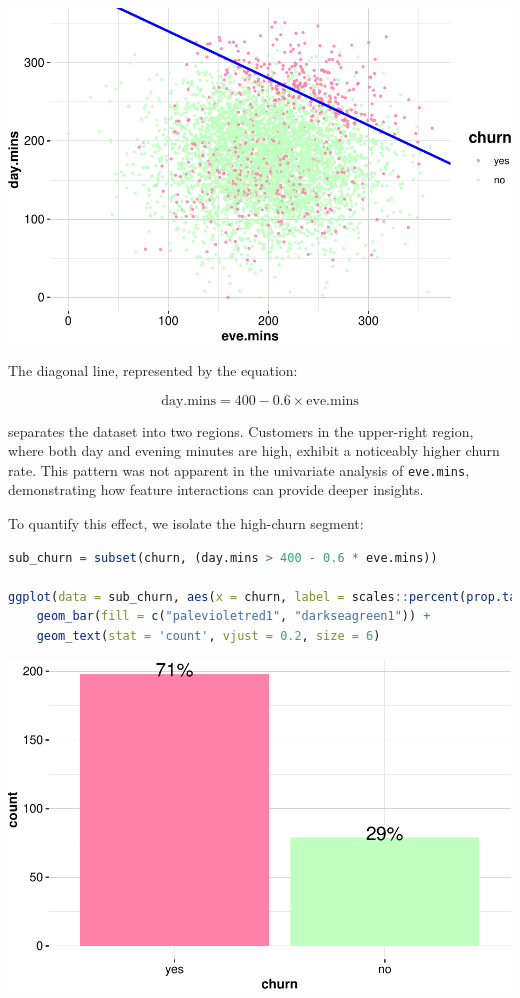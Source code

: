 \documentclass[
]{book}
\newcommand{\passthrough}[1]{#1}
\theoremstyle{definition}
\theoremstyle{definition}
\theoremstyle{definition}
\theoremstyle{definition}
\theoremstyle{remark}
\begin{document}
\begin{center}\includegraphics[width=0.7\linewidth]{EDA_files/figure-latex/unnamed-chunk-15-1} \end{center}

The diagonal line, represented by the equation:

\[
\text{day.mins} = 400 - 0.6 \times \text{eve.mins}
\]

separates the dataset into two regions. Customers in the upper-right region, where both day and evening minutes are high, exhibit a noticeably higher churn rate. This pattern was not apparent in the univariate analysis of \passthrough{\lstinline!eve.mins!}, demonstrating how feature interactions can provide deeper insights.

To quantify this effect, we isolate the high-churn segment:

\begin{lstlisting}[language=R]
sub_churn = subset(churn, (day.mins > 400 - 0.6 * eve.mins))

ggplot(data = sub_churn, aes(x = churn, label = scales::percent(prop.table(stat(count))))) +
    geom_bar(fill = c("palevioletred1", "darkseagreen1")) + 
    geom_text(stat = 'count', vjust = 0.2, size = 6)
\end{lstlisting}

\begin{center}\includegraphics[width=0.7\linewidth]{EDA_files/figure-latex/unnamed-chunk-16-1} \end{center}
\end{document}
